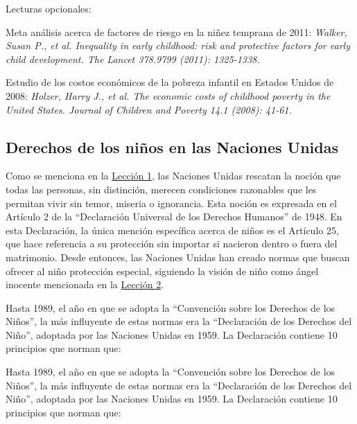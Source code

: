 \documentclass{tufte-handout}
\begin{document}
\bigskip

Lecturas opcionales:

\bigskip

Meta análisis acerca de factores de riesgo en la niñez temprana de 2011: \textit{Walker, Susan P., et al. Inequality in early childhood: risk and protective factors for early child development. The Lancet 378.9799 (2011): 1325-1338.}

\bigskip

Estudio de los costos económicos de la pobreza infantil en Estados Unidos de 2008: \textit{Holzer, Harry J., et al. The economic costs of childhood poverty in the United States. Journal of Children and Poverty 14.1 (2008): 41-61.}

\bigskip

\subsection{Derechos de los niños en las Naciones Unidas}\label{subsec:nacionesunidas}


Como se menciona en la \hyperref[subsec:derecho]{Lección 1}, las Naciones Unidas rescatan la noción que todas las personas, sin distinción, merecen condiciones razonables que les permitan vivir sin temor, miseria o ignorancia. Esta noción es expresada en el Artículo 2 de la “Declaración Universal de los Derechos Humanos” de 1948. En esta Declaración, la única mención específica acerca de niños es el Artículo 25, que hace referencia a su protección sin importar si nacieron dentro o fuera del matrimonio. Desde entonces, las Naciones Unidas han creado normas que buscan ofrecer al niño protección especial, siguiendo la visión de niño como ángel inocente mencionada en la \hyperref[subsec:visiones]{Lección 2}. 

Hasta 1989, el año en que se adopta la “Convención sobre los Derechos de los Niños”, la más influyente de estas normas era la “Declaración de los Derechos del Niño”, adoptada por las Naciones Unidas en 1959. La Declaración contiene 10 principios que norman que:

Hasta 1989, el año en que se adopta la “Convención sobre los Derechos de los Niños”, la más influyente de estas normas era la “Declaración de los Derechos del Niño”, adoptada por las Naciones Unidas en 1959. La Declaración contiene 10 principios que norman que:
\end{document}
